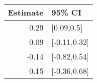 \begin{tabular}{rl}
  \hline
Estimate & 95\% CI \\ 
  \hline
0.29 & [0.09,0.5] \\ 
  0.09 & [-0.11,0.32] \\ 
  -0.14 & [-0.82,0.54] \\ 
  0.15 & [-0.36,0.68] \\ 
   \hline
\end{tabular}


